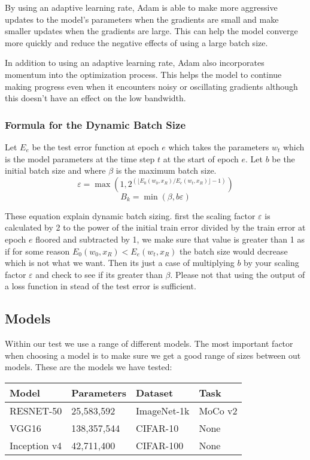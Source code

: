 \documentclass[11pt]{article}
\begin{document}
By using an adaptive learning rate, Adam is able to make more aggressive updates to the model's parameters when the gradients are small and make smaller updates when the gradients are large. This can help the model converge more quickly and reduce the negative effects of using a large batch size.
 
In addition to using an adaptive learning rate, Adam also incorporates momentum into the optimization process. This helps the model to continue making progress even when it encounters noisy or oscillating gradients although this doesn't have an effect on the low bandwidth.



\subsubsection{Formula for the Dynamic Batch Size}

Let $E_e$ be the test error function at epoch $e$ which takes the parameters $w_t$ which is the model parameters at the time step $t$ at the start of epoch $e$. Let $b$ be the initial batch size and where      $\beta$ is the maximum batch size.  
\newpage
\begingroup
\Large
$$
\varepsilon = \max \left(1, 2^{(\lfloor E_0(w_0,x_R)/E_e(w_t, x_R) \rfloor -1)} \right)
$$
$$
B_k = \min \left(\beta,b\varepsilon\right)
$$
\endgroup

These equation explain dynamic batch sizing. first the scaling factor $\varepsilon$ is calculated by 2 to the power of the initial train error divided by the train error at epoch $e$ floored and subtracted by 1, we make sure that value is greater than 1 as if for some reason $E_0(w_0,x_R) < E_e(w_t, x_R)$ the batch size would decrease which is not what we want. Then its just a case of multiplying $b$ by your scaling factor    $\varepsilon$ and check to see if its greater than $\beta$. Please not that using the output of a loss function in stead of the test error is sufficient.


\subsection{Models}
Within our test we use a range of different models. The most important factor when choosing a model is to make sure we get a good range of sizes between out models. These are the models we have tested:

\begin{center}
\begin{tabular}{| p{3cm} | p{3cm} | p{3cm} | p{3cm} |} 
\hline
Model & Parameters & Dataset & Task \\ \hline
RESNET-50 & 25,583,592 & ImageNet-1k & MoCo v2 \\ \hline
VGG16 &  138,357,544 & CIFAR-10 & None \\ \hline
Inception v4 & 42,711,400 & CIFAR-100 & None\\ \hline
\end{tabular}
\end{center}
\end{document}
